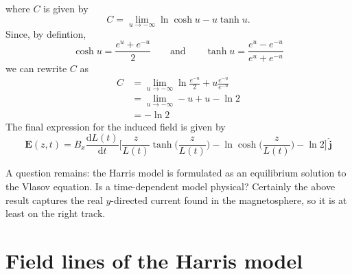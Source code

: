 \documentclass{article}
\begin{document}
	where $C$ is given by
	\[
		C = \lim_{u\to{-\infty}}\ln\cosh u - u\tanh u.
	\]
	Since, by defintion,
	\[
		\cosh u = \frac{e^u + e^{-u}}{2} \qquad \text{and} \qquad \tanh u = \frac{e^u - e^{-u}}{e^u + e^{-u}}
	\]
	we can rewrite $C$ as
	\begin{align*}
		C &= \lim_{u\to{-\infty}}\ln\frac{e^{-u}}{2} + u\frac{e^{-u}}{e^{-u}} \\
		&= \lim_{u\to-\infty}-u + u - \ln 2\\
		&= {-\ln 2}
	\end{align*}
	The final expression for the induced field is given by
	\[
		\mathbf{E}(z, t) = B_x\frac{\mathrm{d}L(t)}{\mathrm{d}t}\Big[\frac{z}{L(t)}\tanh\Big(\frac{z}{L(t)}\Big)- \ln\cosh\Big(\frac{z}{L(t)} \Big) - \ln 2\Big]\,\hat{\mathbf{j}}
	\]
	
	A question remains: the Harris model is formulated as an equilibrium solution to the Vlasov equation. Is a time-dependent model physical? Certainly the above result captures the real $y$-directed current found in the magnetosphere, so it is at least on the right track.
	
	\section{Field lines of the Harris model}
	
\end{document}
